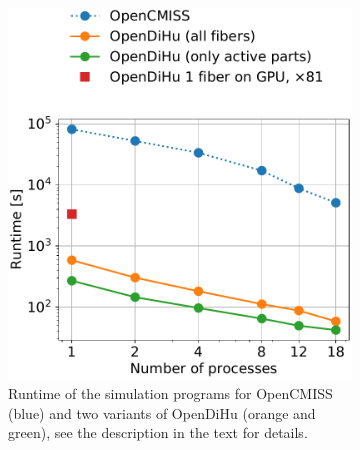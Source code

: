 \begin{figure}
  \centering%
  \begin{subfigure}[t]{0.49\textwidth}%
    \centering%
    \includegraphics[width=\textwidth]{images/results/studies/0_strong_scaling_runtime.pdf}%
    \caption{Runtime of the simulation programs for OpenCMISS (blue) and two variants of OpenDiHu (orange and green), see the description in the text for details. 
    }%
    \label{fig:0_strong_scaling_runtime}%
  \end{subfigure}
  \quad
  \begin{subfigure}[t]{0.47\textwidth}%
    \centering%

\end{subfigure}
\end{figure}
